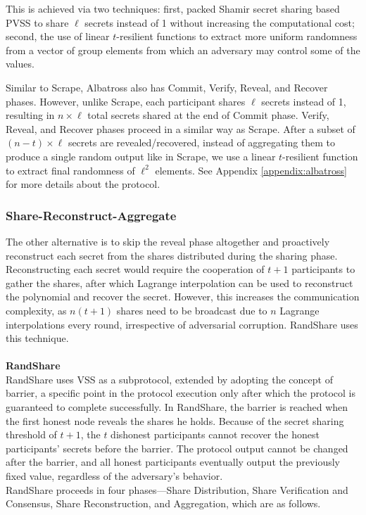 \documentclass[letterpaper,twocolumn,10pt]{article}
\theoremstyle{definition}
\theoremstyle{remark}
\begin{document}
This is achieved via two techniques: first, packed Shamir secret sharing based PVSS to share $\ell$ secrets instead of 1 without increasing the computational cost; second, the use of linear $t$-resilient functions to extract more uniform randomness from a vector of group elements from which an adversary may control some of the values. 

Similar to Scrape, Albatross also has Commit, Verify, Reveal, and Recover phases. However, unlike Scrape, each participant shares $\ell$ secrets instead of 1, resulting in $n \times \ell$ total secrets shared at the end of Commit phase. Verify, Reveal, and Recover phases proceed in a similar way as Scrape. After a subset of $(n-t) \times \ell$ secrets are revealed/recovered, instead of aggregating them to produce a single random output like in Scrape, we use a linear $t$-resilient function to extract final randomness of $\ell^2$ elements. See Appendix \ref{appendix:albatross} for more details about the protocol.\\

\subsubsection{Share-Reconstruct-Aggregate}
The other alternative is to skip the reveal phase altogether and proactively reconstruct each secret from the shares distributed during the sharing phase. Reconstructing each secret would require the cooperation of $t+1$ participants to gather the shares, after which Lagrange interpolation can be used to reconstruct the polynomial and recover the secret. However, this increases the communication complexity, as $n (t + 1)$ shares need to be broadcast due to $n$ Lagrange interpolations every round, irrespective of adversarial corruption. RandShare \cite{syta2017scalable} uses this technique.\\\\
\textbf{RandShare}\\
RandShare uses VSS as a subprotocol, extended by adopting the concept of barrier, a specific point in the protocol execution only after which the protocol is guaranteed to complete successfully. In RandShare, the barrier is reached when the first honest node reveals the shares he holds. Because of the secret sharing threshold of $t + 1$, the $t$ dishonest participants cannot recover the honest participants’ secrets before the barrier. The protocol output cannot be changed after the barrier, and all honest participants eventually output the previously fixed value, regardless of the adversary’s behavior.\\
RandShare proceeds in four phases---Share Distribution, Share Verification and Consensus, Share Reconstruction, and Aggregation, which are as follows.
\end{document}
